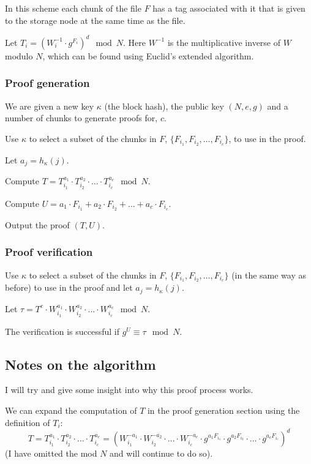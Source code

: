 \documentclass[12pt,a4paper,twoside,openright]{report}
\begin{document}
In this scheme each chunk of the file $F$ has a tag associated with it that is given to the storage node
at the same time as the file.

Let $T_i = \left(W_i^{-1} \cdot g^{F_i}\right)^d \mod N$. Here $W^{-1}$ is the multiplicative inverse of $W$ modulo $N$,
which can be found using Euclid's extended algorithm.

\subsubsection{Proof generation}

We are given a new key $\kappa$ (the block hash), the public key $(N, e, g)$ and a number of chunks to generate proofs for, $c$.

Use $\kappa$ to select a subset of the chunks in $F$, $\{F_{i_1}, F_{i_2}, \ldots, F_{i_c}\}$, to use in the proof.

Let $a_j = h_\kappa(j)$.

Compute $T = T^{a_1}_{i_1} \cdot T^{a_2}_{i_2} \cdot \ldots \cdot T^{a_c}_{i_c} \mod N$.

Compute $U = a_1 \cdot F_{i_1} + a_2 \cdot F_{i_2} + \ldots + a_c \cdot F_{i_c}$.

Output the proof $(T, U)$.

\subsubsection{Proof verification}

Use $\kappa$ to select a subset of the chunks in $F$, $\{F_{i_1}, F_{i_2}, \ldots, F_{i_c}\}$ (in the same way as before) to use in the proof
and let $a_j = h_\kappa(j)$.

Let $\tau = T^e \cdot W_{i_1}^{a_1} \cdot W_{i_2}^{a_2} \cdot \ldots \cdot W_{i_c}^{a_c} \mod N$.

The verification is successful if $g^U \equiv \tau \mod N$.

\subsection{Notes on the algorithm}

I will try and give some insight into why this proof process works.

We can expand the computation of $T$ in the proof generation section using the definition of $T_i$:
\[T = T^{a_1}_{i_1} \cdot T^{a_2}_{i_2} \cdot \ldots \cdot T^{a_c}_{i_c} =
\left(W_{i_1}^{-a_1} \cdot W_{i_2}^{-a_2} \cdot \ldots \cdot W_{i_c}^{-a_c} \cdot g^{a_1 F_{i_1}} \cdot g^{a_2 F_{i_2}} \cdot \ldots \cdot g^{a_c F_{i_c}}\right)^d\]
(I have omitted the mod $N$ and will continue to do so).
\end{document}
